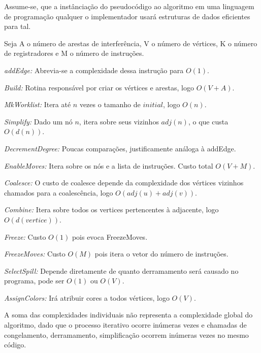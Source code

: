 Assume-se, que a instânciação do pseudocódigo ao algoritmo em uma linguagem de programação qualquer o implementador usará estruturas de dados eficientes para tal.

Seja A o número de arestas de interferência, V o número de vértices, K o número de registradores e M o número de instruções.

\textit{addEdge:} Abrevia-se a complexidade dessa instrução para $O(1)$.

\textit{Build:} Rotina responsável por criar os vértices e arestas, logo $O(V + A)$.

\textit{MkWorklist: } Itera até $n$ vezes o tamanho de $initial$, logo $O(n)$.

\textit{Simplify: } Dado um nó $n$, itera sobre seus vizinhos $adj(n)$, o que custa $O(d(n))$.

\textit{DecrementDegree: } Poucas comparações, justificamente análoga à addEdge.

\textit{EnableMoves: } Itera sobre os nós e a lista de instruções. Custo total $O(V + M)$.

\textit{Coalesce: } O custo de coalesce depende da complexidade dos vértices vizinhos chamados para a coalescência, logo $O(adj(u) + adj(v))$.

\textit{Combine: } Itera sobre todos os vertices pertencentes à adjacente, logo $O(d(vertice))$.

\textit{Freeze: } Custo $O(1)$ pois evoca FreezeMoves.

\textit{FreezeMoves: } Custo $O(M)$ pois itera o vetor do número de instruções.

\textit{SelectSpill: } Depende diretamente de quanto derramamento será causado no programa, pode ser $O(1)$ ou $O(V)$.

\textit{AssignColors: } Irá atribuir cores a todos vértices, logo $O(V)$.


A soma das complexidades individuais não representa a complexidade global do algoritmo, dado que o processo iterativo ocorre inúmeras vezes e chamadas de congelamento, derramamento, simplificação ocorrem inúmeras vezes no mesmo código.